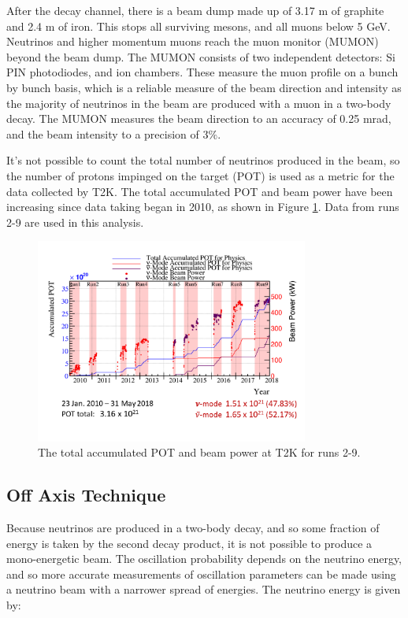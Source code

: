 After the decay channel, there is a beam dump made up of 3.17 m of graphite and 2.4 m of iron. This stops all surviving mesons, and all muons below 5 GeV. Neutrinos and higher momentum muons reach the muon monitor (MUMON) beyond the beam dump. The MUMON consists of two independent detectors: Si PIN photodiodes, and ion chambers. These measure the muon profile on a bunch by bunch basis, which is a reliable measure of the beam direction and intensity as the majority of neutrinos in the beam are produced with a muon in a two-body decay. The MUMON measures the beam direction to an accuracy of 0.25 mrad, and the beam intensity to a precision of 3$\%$\cite{mumon}.

It's not possible to count the total number of neutrinos produced in the beam, so the number of protons impinged on the target (POT) is used as a metric for the data collected by T2K. The total accumulated POT and beam power have been increasing since data taking began in 2010, as shown in Figure \ref{fig:pot}. Data from runs 2-9 are used in this analysis.

\begin{figure}[!htbp]
\centering
\includegraphics*[width=0.8\textwidth,clip]{figs/pot}
\caption{The total accumulated POT and beam power at T2K for runs 2-9.} \label{fig:pot}
\end{figure}

\subsection{Off Axis Technique}

Because neutrinos are produced in a two-body decay, and so some fraction of energy is taken by the second decay product, it is not possible to produce a mono-energetic beam. The oscillation probability depends on the neutrino energy, and so more accurate measurements of oscillation parameters can be made using a neutrino beam with a narrower spread of energies. The neutrino energy is given by\cite{Enuoffaxis}:

